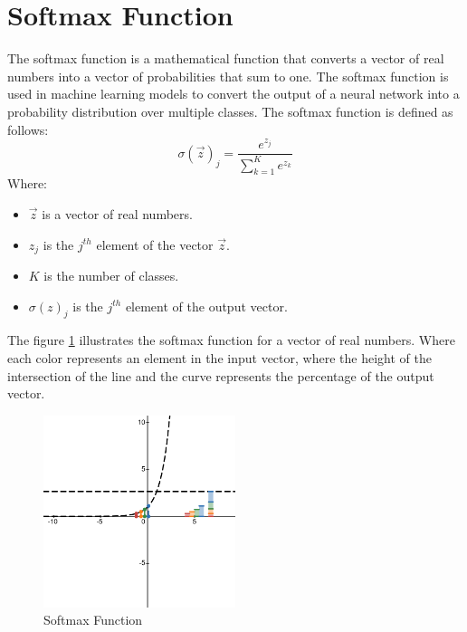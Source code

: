 \section{Softmax Function}
The softmax function is a mathematical function that converts a vector of real numbers into a vector of probabilities that sum to one. The softmax function is used in machine learning models to convert the output of a neural network into a probability distribution over multiple classes. The softmax function is defined as follows:
\begin{equation}
    \sigma(\vec{z})_j = \frac{e^{z_j}}{\sum_{k=1}^{K} e^{z_k}}
\end{equation}
Where:
\begin{itemize}[noitemsep]
    \item $\vec{z}$ is a vector of real numbers.
    \item $z_j$ is the $j^{th}$ element of the vector $\vec{z}$.
    \item $K$ is the number of classes.
    \item $\sigma(z)_j$ is the $j^{th}$ element of the output vector.
\end{itemize}
The figure \ref{fig:softmax} illustrates the softmax function for a vector of real numbers. Where each color represents an element in the input vector, where the height of the intersection of the line and the curve represents the percentage of the output vector.
\begin{figure}[H]
    \centering
    \includegraphics[width=0.5\textwidth]{assets/desmos-graph.png}
    \caption[Softmax Function]{Softmax Function}
    \label{fig:softmax}
\end{figure}
